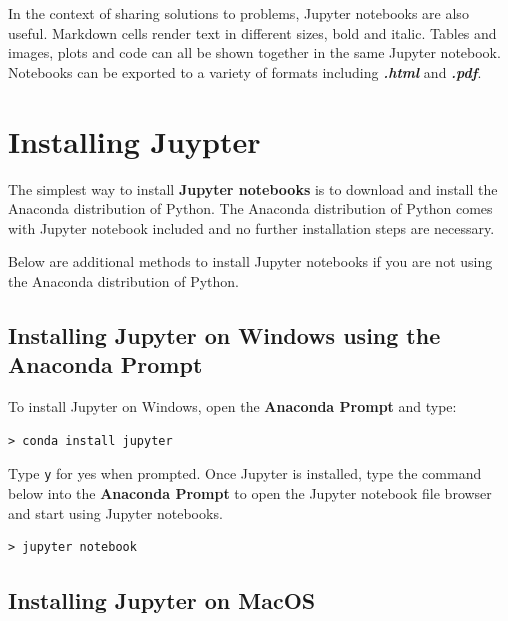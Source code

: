 \documentclass{book}
\begin{document}
In the context of sharing solutions to problems, Jupyter notebooks are
also useful. Markdown cells render text in different sizes, bold and
italic. Tables and images, plots and code can all be shown together in
the same Jupyter notebook. Notebooks can be exported to a variety of
formats including \textbf{\emph{.html}} and \textbf{\emph{.pdf}}.
    




    
        \section{Installing Juypter}\label{installing-juypter}
    




    
        The simplest way to install \textbf{Jupyter notebooks} is to download
and install the Anaconda distribution of Python. The Anaconda
distribution of Python comes with Jupyter notebook included and no
further installation steps are necessary.

Below are additional methods to install Jupyter notebooks if you are not
using the Anaconda distribution of Python.
    




    
        \subsection{Installing Jupyter on Windows using the Anaconda
Prompt}\label{installing-jupyter-on-windows-using-the-anaconda-prompt}

To install Jupyter on Windows, open the \textbf{Anaconda Prompt} and
type:

\begin{lstlisting}
> conda install jupyter
\end{lstlisting}

Type \lstinline!y! for yes when prompted. Once Jupyter is installed,
type the command below into the \textbf{Anaconda Prompt} to open the
Jupyter notebook file browser and start using Jupyter notebooks.

\begin{lstlisting}
> jupyter notebook
\end{lstlisting}
    




    
        \subsection{Installing Jupyter on
MacOS}\label{installing-jupyter-on-macos}
\end{document}
